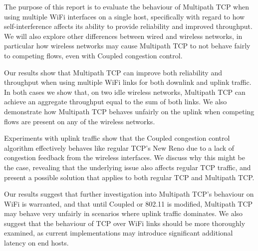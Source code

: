 \documentclass[12pt,a4paper]{article}
\begin{document}
The purpose of this report is to evaluate the behaviour of Multipath TCP when
using multiple WiFi interfaces on a single host, specifically with regard to
how self-interference affects its ability to provide reliability and improved
throughput. We will also explore other differences between wired and wireless
networks, in particular how wireless networks may cause Multipath TCP to not
behave fairly to competing flows, even with Coupled congestion control.

Our results show that Multipath TCP can improve both reliability and throughput
when using multiple WiFi links for both downlink and uplink traffic. In both
cases we show that, on two idle wireless networks, Multipath TCP can achieve an
aggregate throughput equal to the sum of both links. We also demonstrate how
Multipath TCP behaves unfairly on the uplink when competing flows are present on
any of the wireless networks.

Experiments with uplink traffic show that the Coupled congestion control
algorithm effectively behaves like regular TCP's New Reno due to a lack of
congestion feedback from the wireless interfaces. We discuss why this might be
the case, revealing that the underlying issue also affects regular TCP traffic,
and present a possible solution that applies to both regular TCP and Multipath
TCP.

Our results suggest that further investigation into Multipath TCP's behaviour on
WiFi is warranted, and that until Coupled or 802.11 is modified, Multipath TCP
may behave very unfairly in scenarios where uplink traffic dominates. We also
suggest that the behaviour of TCP over WiFi links should be more thoroughly
examined, as current implementations may introduce significant additional
latency on end hosts.
\end{document}
